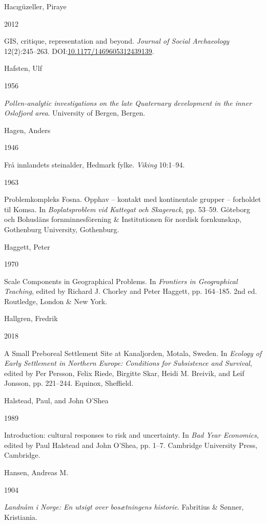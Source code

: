 \documentclass[
  12pt,
  a4paper,
  oneside]{book}
\newlength{\cslhangindent}
\newlength{\csllabelwidth}
\newlength{\cslentryspacingunit} %
\newenvironment{CSLReferences}[2] %
 {%
  \setlength{\parindent}{0pt}
  \ifodd #1
  \let\oldpar\par
  \def\par{\hangindent=\cslhangindent\oldpar}
  \fi
  \setlength{\parskip}{#2\cslentryspacingunit}
 }%
 {}
\newcommand{\CSLBlock}[1]{#1\hfill\break}
\newcommand{\CSLLeftMargin}[1]{\parbox[t]{\csllabelwidth}{#1}}
\newcommand{\CSLRightInline}[1]{\parbox[t]{\linewidth - \csllabelwidth}{#1}\break}
\begin{document}
\begin{CSLReferences}{0}{0}
\leavevmode{}%
\CSLBlock{Hacıgüzeller, Piraye}
\CSLLeftMargin{ 2012}%
\CSLRightInline{GIS, critique, representation and beyond. \emph{Journal of Social Archaeology} 12(2):245--263. DOI:\href{https://doi.org/10.1177/1469605312439139}{10.1177/1469605312439139}.}

\leavevmode{}%
\CSLBlock{Hafsten, Ulf}
\CSLLeftMargin{ 1956}%
\CSLRightInline{\emph{{Pollen-analytic investigations on the late Quaternary development in the inner Oslofjord area}}. University of Bergen, Bergen.}

\leavevmode{}%
\CSLBlock{Hagen, Anders}
\CSLLeftMargin{ 1946}%
\CSLRightInline{{Frå innlandets steinalder, Hedmark fylke}. \emph{Viking} 10:1--94.}

\leavevmode{}%
\CSLLeftMargin{ 1963 }%
\CSLRightInline{{Problemkompleks Fosna. Opphav -- kontakt med kontinentale grupper -- forholdet til Komsa}. In \emph{{Boplatsproblem vid Kattegat och Skagerack}}, pp. 53--59. Göteborg och Bohusläns fornminnesförening \& Institutionen för nordisk fornkunskap, Gothenburg University, Gothenburg.}

\leavevmode{}%
\CSLBlock{Haggett, Peter}
\CSLLeftMargin{ 1970}%
\CSLRightInline{{Scale Components in Geographical Problems}. In \emph{{Frontiers in Geographical Teaching}}, edited by Richard J. Chorley and Peter Haggett, pp. 164--185. 2nd ed. Routledge, London \& New York.}

\leavevmode{}%
\CSLBlock{Hallgren, Fredrik}
\CSLLeftMargin{ 2018}%
\CSLRightInline{{A Small Preboreal Settlement Site at Kanaljorden, Motala, Sweden}. In \emph{{Ecology of Early Settlement in Northern Europe: Conditions for Subsistence and Survival}}, edited by Per Persson, Felix Riede, Birgitte Skar, Heidi M. Breivik, and Leif Jonsson, pp. 221--244. Equinox, Sheffield.}

\leavevmode{}%
\CSLBlock{Halstead, Paul, and John O'Shea}
\CSLLeftMargin{ 1989}%
\CSLRightInline{{Introduction: cultural responses to risk and uncertainty}. In \emph{{Bad Year Economics}}, edited by Paul Halstead and John O'Shea, pp. 1--7. Cambridge University Press, Cambridge.}

\leavevmode{}%
\CSLBlock{Hansen, Andreas M.}
\CSLLeftMargin{ 1904}%
\CSLRightInline{\emph{{Landnåm i Norge: En utsigt over bosætningens historie}}. Fabritius \& Sønner, Kristiania.}


\end{CSLReferences}
\end{document}
